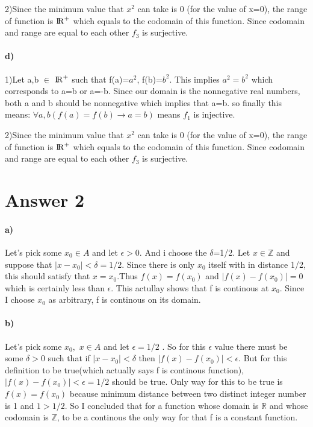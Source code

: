 \documentclass[12pt]{article}
\begin{document}
2)Since the minimum value that $x^2$ can take is 0 (for the value of x=0), the range of function is ${\rm I\!R}^+$ which equals to the codomain of this function. Since codomain and range are equal to each other $f_3$ is surjective.


\paragraph{d)}
1)Let a,b $\in$ ${\rm I\!R}^+$ such that f(a)=$a^2$, f(b)=$b^2$. This implies $a^2=b^2$ which corresponds to a=b or a=-b. Since our domain is the nonnegative real numbers, both a and b should be nonnegative which implies that a=b. so finally this means: $\forall a,b(f(a)=f(b)\rightarrow a=b)$ means $f_1$ is injective. 

2)Since the minimum value that $x^2$ can take is 0 (for the value of x=0), the range of function is ${\rm I\!R}^+$ which equals to the codomain of this function. Since codomain and range are equal to each other $f_3$ is surjective.


\section*{Answer 2}
\paragraph{a)}
Let's pick some $x_0\in A$ and let $\epsilon >0$. And i choose the $\delta$=1/2. Let $x \in {\mathbb{Z}}$ and suppose that $|x-x_0|<\delta=1/2$. Since there is only $x_0$ itself with in distance 1/2, this should satisfy that $x=x_0$.Thus $f(x)=f(x_0)$ and $|f(x)-f(x_0)|=0$ which is certainly less than $\epsilon$.  This actullay shows that f is continous at $x_0$. Since I choose $x_0$ as arbitrary, f is continous on its domain.


\paragraph{b)}
Let's pick some $x_0,$ $x \in A$ and let $\epsilon =1/2$ . So for this $\epsilon$ value there must be some $\delta >0$ such that if $|x-x_0|<\delta$ then $|f(x)-f(x_0)|<\epsilon$. But for this definition to be true(which actually says f is continous function), $|f(x)-f(x_0)|<\epsilon=1/2$ should be true. Only way for this to be true is $f(x)=f(x_0)$ because minimum distance between two distinct integer number is 1 and $1>1/2$. So I concluded that for a function whose domain is $\mathbb{R}$ and whose codomain is $\mathbb{Z}$, to be a continous the only way for that f is a constant function.
\end{document}

